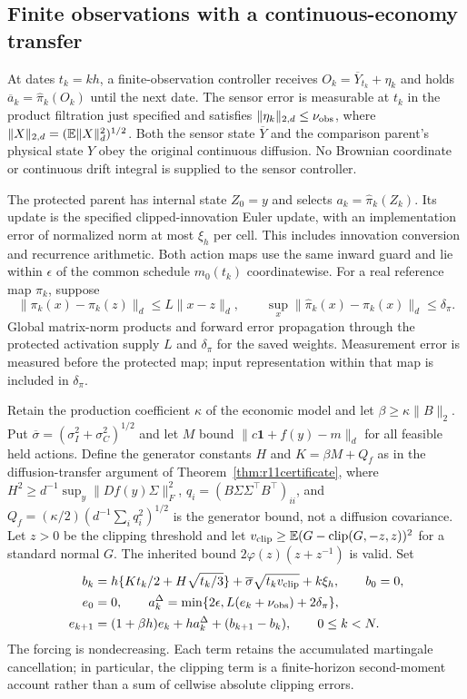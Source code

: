 \subsection{Finite observations with a continuous-economy transfer}
\label{sec:r14sensing}
At dates $t_k=kh$, a finite-observation controller receives
$O_k=\overline Y_{t_k}+\eta_k$ and holds
$\overline a_k=\widehat\pi_k(O_k)$ until the next date. The sensor
error is measurable at $t_k$ in the product filtration just specified
and satisfies $\|\eta_k\|_{2,d}\leq\nu_{\rm obs}$, where
$\|X\|_{2,d}=(\mathbb E\|X\|_d^2)^{1/2}$. Both the sensor state
$\overline Y$ and the comparison parent's physical state $Y$ obey the
original continuous diffusion. No Brownian coordinate or continuous
drift integral is supplied to the sensor controller.

The protected parent has internal state $Z_0=y$ and selects
$a_k=\widehat\pi_k(Z_k)$. Its update is the specified clipped-innovation
Euler update, with an implementation error of normalized norm at most
$\xi_h$ per cell. This includes innovation conversion and recurrence
arithmetic. Both action maps use the same inward guard and lie within
$\epsilon$ of the common schedule $m_0(t_k)$ coordinatewise.
For a real reference map $\pi_k$, suppose
\[
 \|\pi_k(x)-\pi_k(z)\|_d\leq L\|x-z\|_d,
 \qquad \sup_x\|\widehat\pi_k(x)-\pi_k(x)\|_d\leq\delta_\pi.
\]
Global matrix-norm products and forward error propagation through the
protected activation supply $L$ and $\delta_\pi$ for the saved weights.
Measurement error is measured before the protected map; input
representation within that map is included in $\delta_\pi$.

Retain the production coefficient $\kappa$ of the economic model and
let $\beta\geq\kappa\|B\|_2$. Put
$\overline\sigma=(\sigma_I^2+\sigma_C^2)^{1/2}$ and let $M$ bound
$\|c\bm1+f(y)-m\|_d$ for all feasible held actions. Define the
generator constants $H$ and $K=\beta M+Q_f$ as in the diffusion-transfer argument of Theorem~\ref{thm:r11certificate},
where $H^2\geq d^{-1}\sup_y\|Df(y)\Sigma\|_F^2$, $q_i=(B\Sigma\Sigma^\top B^\top)_{ii}$, and $Q_f=(\kappa/2)(d^{-1}\sum_iq_i^2)^{1/2}$ is the generator
bound, not a diffusion covariance. Let $z>0$ be the clipping threshold and let
$v_{\rm clip}\geq\mathbb E(G-\operatorname{clip}(G,-z,z))^2$ for a standard normal
$G$. The inherited bound $2\varphi(z)(z+z^{-1})$ is valid.
Set
\begin{align}
 b_k&=h\{Kt_k/2+H\sqrt{t_k/3}\}
          +\overline\sigma\sqrt{t_kv_{\rm clip}}+k\xi_h,
          \qquad b_0=0,\label{eq:r14sensorforcing}\\
 e_0&=0,\qquad
 a_k^\Delta=\min\{2\epsilon,L(e_k+\nu_{\rm obs})+2\delta_\pi\},\notag\\
 e_{k+1}&=(1+\beta h)e_k+h a_k^\Delta+(b_{k+1}-b_k),
       \qquad 0\leq k<N.\label{eq:r14sensorrecursion}
\end{align}
The forcing is nondecreasing. Each term retains the accumulated
martingale cancellation; in particular, the clipping term is a
finite-horizon second-moment account rather than a sum of cellwise
absolute clipping errors.

